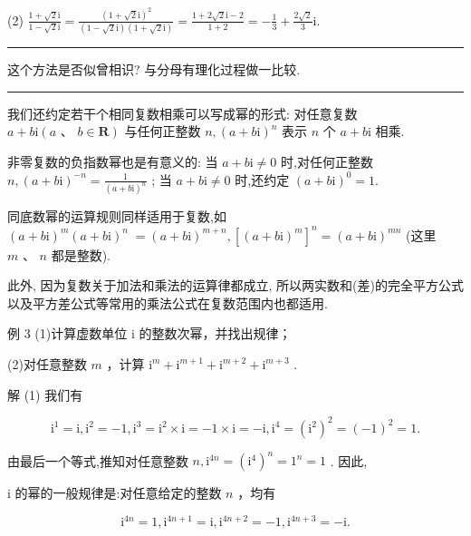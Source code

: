 \documentclass[10pt]{article}
\newcommand{\HRule}{\begin{center}\rule{0.9\linewidth}{0.2mm}\end{center}}
\begin{document}
(2) \(\frac{1 + \sqrt{2}\mathrm{i}}{1 - \sqrt{2}\mathrm{i}} = \frac{{\left( 1 + \sqrt{2}\mathrm{i}\right) }^{2}}{\left( {1 - \sqrt{2}\mathrm{i}}\right) \left( {1 + \sqrt{2}\mathrm{i}}\right) } = \frac{1 + 2\sqrt{2}\mathrm{i} - 2}{1 + 2} =  - \frac{1}{3} + \frac{2\sqrt{2}}{3}\mathrm{i}.\)

\HRule

这个方法是否似曾相识? 与分母有理化过程做一比较.

\HRule

我们还约定若干个相同复数相乘可以写成幂的形式: 对任意复数 \(a + b\mathrm{i}\left( {a\text{ 、 }b \in  \mathbf{R}}\right)\) 与任何正整数 \(n,{\left( a + b\mathrm{i}\right) }^{n}\) 表示 \(n\) 个 \(a + b\mathrm{i}\) 相乘.

非零复数的负指数幂也是有意义的: 当 \(a + b\mathrm{i} \neq  0\) 时,对任何正整数 \(n,{\left( a + b\mathrm{i}\right) }^{-n} = \frac{1}{{\left( a + b\mathrm{i}\right) }^{n}}\) ; 当 \(a + b\mathrm{i} \neq  0\) 时,还约定 \({\left( a + b\mathrm{i}\right) }^{0} = 1.\)

同底数幂的运算规则同样适用于复数,如 \({\left( a + b\mathrm{i}\right) }^{m}{\left( a + b\mathrm{i}\right) }^{n} \; = {\left( a + b\mathrm{i}\right) }^{m + n},{\left\lbrack  {\left( a + b\mathrm{i}\right) }^{m}\right\rbrack  }^{n} = {\left( a + b\mathrm{i}\right) }^{mn}\) (这里 \(m\text{ 、 }n\) 都是整数).

此外, 因为复数关于加法和乘法的运算律都成立, 所以两实数和(差)的完全平方公式以及平方差公式等常用的乘法公式在复数范围内也都适用.

例 3 (1)计算虚数单位 i 的整数次幂，并找出规律；

(2)对任意整数 \(m\) ，计算 \({\mathrm{i}}^{m} + {\mathrm{i}}^{m + 1} + {\mathrm{i}}^{m + 2} + {\mathrm{i}}^{m + 3}\) .

解 (1) 我们有

\[
{\mathrm{i}}^{1} = \mathrm{i},{\mathrm{i}}^{2} =  - 1,{\mathrm{i}}^{3} = {\mathrm{i}}^{2} \times  \mathrm{i} =  - 1 \times  \mathrm{i} =  - \mathrm{i},{\mathrm{i}}^{4} = {\left( {\mathrm{i}}^{2}\right) }^{2} = {\left( -1\right) }^{2} = 1.
\]

由最后一个等式,推知对任意整数 \(n,{\mathrm{i}}^{4n} = {\left( {\mathrm{i}}^{4}\right) }^{n} = {1}^{n} = 1\) . 因此,

i 的幂的一般规律是:对任意给定的整数 \(n\) ，均有

\[
{\mathrm{i}}^{4n} = 1,{\mathrm{i}}^{{4n} + 1} = \mathrm{i},{\mathrm{i}}^{{4n} + 2} =  - 1,{\mathrm{i}}^{{4n} + 3} =  - \mathrm{i}.
\]
\end{document}

